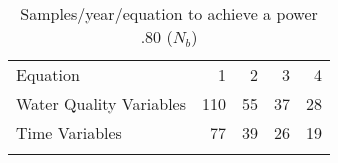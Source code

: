 \begin{table}[htbp]
\caption{Samples/year/equation to achieve a power .80 ($N_b$)}
\begin{center}
\begin{tabular}{lrrrr}
\hline\noalign{\smallskip}
Equation & 1 & 2 & 3 & 4 \\ \cline{2-5}\noalign{\smallskip}
Water Quality Variables & 110 & 55 & 37 & 28 \\ 
Time Variables & 77 & 39  & 26  & 19  \\ \hline\noalign{\smallskip}
\end{tabular}
\end{center}
\label{tab:sytaapeighty}
\end{table}